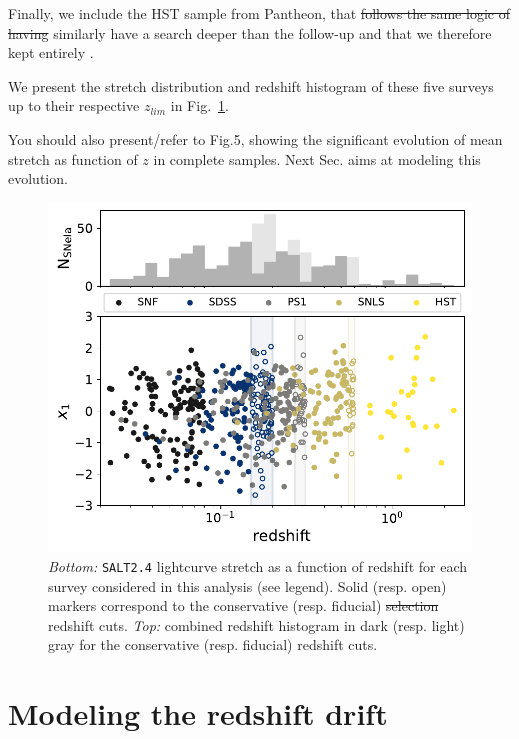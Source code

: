 \documentclass[]{aa} %
\newcommand{\yc}[1]{{\textcolor{BrickRed}{#1}}}
\begin{document}
Finally, we include the HST sample from Pantheon, that \yc{\sout{follows the same logic
of having} similarly have} a search deeper than the follow-up and \yc{that} we therefore kept entirely
\citep{strolger04}. %

We present the stretch
distribution and redshift histogram of these five surveys \yc{up to their respective $z_{lim}$} in
Fig.~\ref{fig:sample}.

\yc{You should also present/refer to Fig.5, showing the significant evolution of mean stretch as function of $z$ in complete samples. Next Sec. aims at modeling this evolution.}

\begin{figure}
    \centering
    \includegraphics[width=0.95\linewidth]{Article_figures/stretchs-cut_btw_hist_cumu_75-lb-cividis.pdf}
    \caption{\textit{Bottom:} \textsc{\texttt{SALT2.4}} lightcurve stretch as a
        function of redshift for each survey considered in this
        analysis (see legend).  Solid (resp. open) markers correspond to the
        conservative (resp. fiducial) \yc{\sout{selection} redshift} cuts. \textit{Top:} combined
        redshift histogram in dark (resp. light) gray for the conservative
    (resp. fiducial) \yc{redshift} cuts.}
    \label{fig:sample}
\end{figure}

\section{Modeling the redshift drift}\label{sec:modeling}
\end{document}
